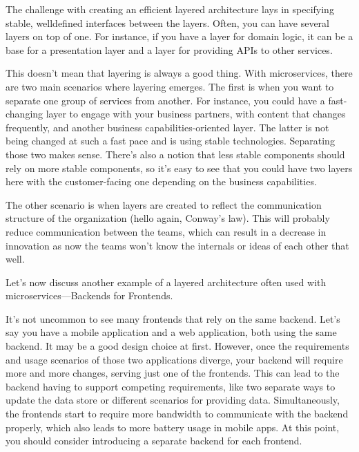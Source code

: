 The challenge with creating an efficient layered architecture lays in specifying stable, welldefined interfaces between the layers. Often, you can have several layers on top of one. For instance, if you have a layer for domain logic, it can be a base for a presentation layer and a layer for providing APIs to other services.

This doesn't mean that layering is always a good thing. With microservices, there are two main scenarios where layering emerges. The first is when you want to separate one group of services from another. For instance, you could have a fast-changing layer to engage with your business partners, with content that changes frequently, and another business capabilities-oriented layer. The latter is not being changed at such a fast pace and is using stable technologies. Separating those two makes sense. There's also a notion that less stable components should rely on more stable components, so it's easy to see that you could have two layers here with the customer-facing one depending on the business capabilities.

The other scenario is when layers are created to reflect the communication structure of the organization (hello again, Conway's law). This will probably reduce communication between the teams, which can result in a decrease in innovation as now the teams won't know the internals or ideas of each other that well.

Let's now discuss another example of a layered architecture often used with microservices—Backends for Frontends.




It's not uncommon to see many frontends that rely on the same backend. Let's say you have a mobile application and a web application, both using the same backend. It may be a good design choice at first. However, once the requirements and usage scenarios of those two applications diverge, your backend will require more and more changes, serving just one of the frontends. This can lead to the backend having to support competing requirements, like two separate ways to update the data store or different scenarios for providing data. Simultaneously, the frontends start to require more bandwidth to communicate with the backend properly, which also leads to more battery usage in mobile apps. At this point, you should consider introducing a separate backend for each frontend.

